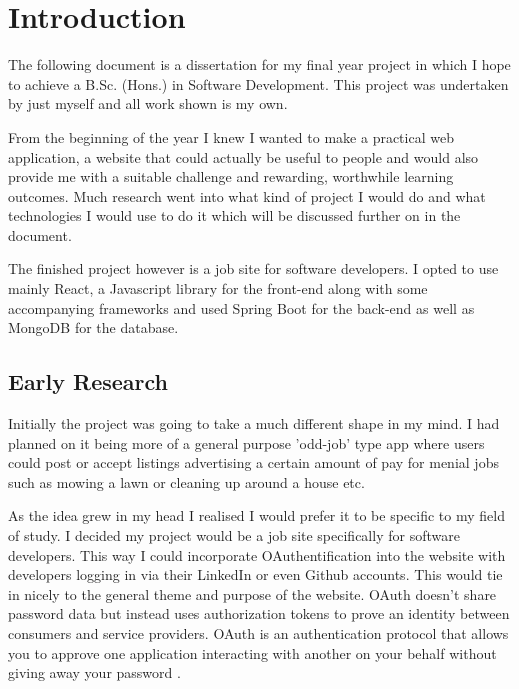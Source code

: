 \chapter{Introduction}
The following document is a dissertation for my final year project in which I hope to achieve a B.Sc. (Hons.) in Software Development. This project was undertaken by just myself and all work shown is my own.

From the beginning of the year I knew I wanted to make a practical web application, a website that could actually be useful to people and would also provide me with a suitable challenge and rewarding, worthwhile learning outcomes. Much research went into what kind of project I would do and what technologies I would use to do it which will be discussed further on in the document.

The finished project however is a job site for software developers. I opted to use mainly React, a Javascript library for the front-end along with some accompanying frameworks and used Spring Boot for the back-end as well as MongoDB for the database.

\section{Early Research}
Initially the project was going to take a much different shape in my mind. I had planned on it being more of a general purpose 'odd-job' type app where users could post or accept listings advertising a certain amount of pay for menial jobs such as mowing a lawn or cleaning up around a house etc.

As the idea grew in my head I realised I would prefer it to be specific to my field of study. I decided my project would be a job site specifically for software developers. This way I could incorporate OAuthentification into the website with developers logging in via their LinkedIn or even Github accounts. This would tie in nicely to the general theme and purpose of the website. OAuth doesn't share password data but instead uses authorization tokens to prove an identity between consumers and service providers. OAuth is an authentication protocol that allows you to approve one application interacting with another on your behalf without giving away your password \cite{OAuth}.

